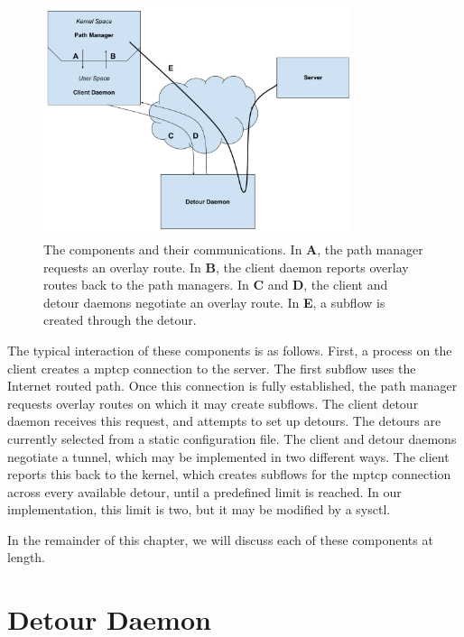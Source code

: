 \documentclass{cwru}
\begin{document}
\begin{figure}[h]
  \centering
  \includegraphics[width=0.8\textwidth]{figures/MovingParts.pdf}
  \caption[Interaction of client, detour, and server]{
    The components and their communications. In \textbf{A}, the path manager
    requests an overlay route. In \textbf{B}, the client daemon reports overlay
    routes back to the path managers. In \textbf{C} and \textbf{D}, the client
    and detour daemons negotiate an overlay route. In \textbf{E}, a subflow is
    created through the detour.
  }
  \label{f:MovingParts}
\end{figure}

The typical interaction of these components is as follows. First, a process on
the client creates a \ac{mptcp} connection to the server. The first subflow uses
the Internet routed path. Once this connection is fully established, the path
manager requests overlay routes on which it may create subflows. The client
detour daemon receives this request, and attempts to set up detours. The detours
are currently selected from a static configuration file. The client and detour
daemons negotiate a tunnel, which may be implemented in two different ways. The
client reports this back to the kernel, which creates subflows for the
\ac{mptcp} connection across every available detour, until a predefined limit is
reached. In our implementation, this limit is two, but it may be modified by a
sysctl.

In the remainder of this chapter, we will discuss each of these components at
length.

\section{Detour Daemon}
\end{document}
